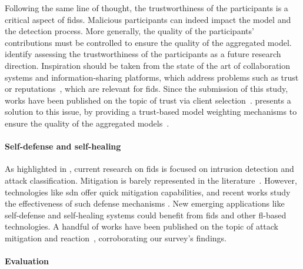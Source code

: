 Following the same line of thought, the trustworthiness of the participants is a critical aspect of \glspl{fids}.
Malicious participants can indeed impact the model and the detection process.
More generally, the quality of the participants' contributions must be controlled to ensure the quality of the aggregated model.
\textcite{zhang_BlockchainbasedFederatedLearning_2020} identify assessing the trustworthiness of the participants as a future research direction.
Inspiration should be taken from the state of the art of collaboration systems and information-sharing platforms, which address problems such as trust or reputations~\cite{wagner_Cyberthreatintelligence_2019a,skopik_problemsharedproblem_2016}, which are relevant for \gls{fids}.
Since the submission of this study, works have been published on the topic of trust via client selection~\cite{cunhaneto_FedSBSFederatedLearningparticipantselection_2024}.
 presents a solution to this issue, by providing a trust-based model weighting mechanisms to ensure the quality of the aggregated models~\cite{lavaur_radar_2024}.


\paragraph{Self-defense and self-healing}

As highlighted in , current research on \gls{fids} is focused on intrusion detection and attack classification.
Mitigation is barely represented in the literature~\cite{rathore_BlockSecIoTNetBlockchainbaseddecentralized_2019}.
However, technologies like \gls{sdn} offer quick mitigation capabilities, and recent works study the effectiveness of such defense mechanisms \cite{bhunia_Dynamicattackdetection_2017,singh_DetectionmitigationDDoS_2020}.
New emerging applications like self-defense and self-healing systems could benefit from \gls{fids} and other \gls{fl}-based technologies.
A handful of works have been published on the topic of attack mitigation and reaction~\cite{panagoda_ApplicationFederatedLearning_2022,decaldasfilho_BotnetDetectionMitigation_2023,phan_FEARFederatedCyberAttack_2022}, corroborating our survey's findings.


\paragraph{Evaluation}

